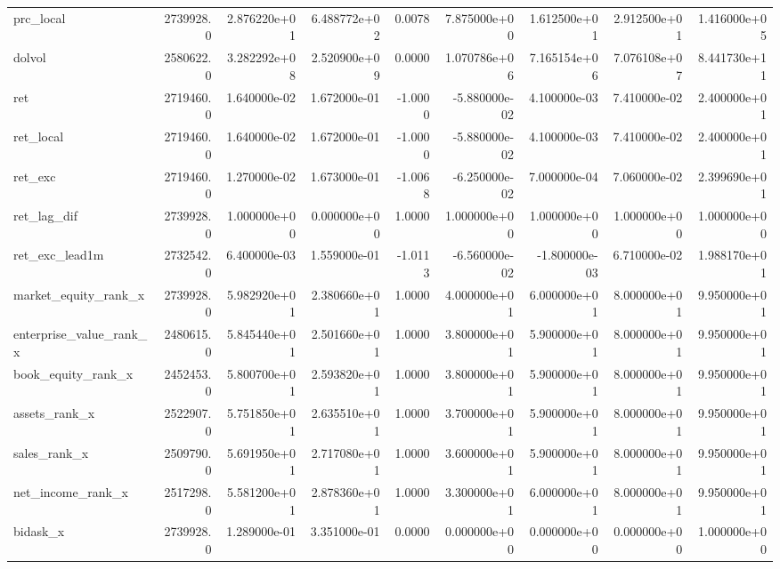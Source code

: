 \documentclass[10pt]{article}
\begin{document}
\begin{landscape}
\begin{longtable}{|l|r|r|r|r|r|r|r|r|}
prc\_local               &  2739928.0 &  2.876220e+01 &  6.488772e+02 &      0.0078 &  7.875000e+00 &  1.612500e+01 &  2.912500e+01 &  1.416000e+05 \\
dolvol                  &  2580622.0 &  3.282292e+08 &  2.520900e+09 &      0.0000 &  1.070786e+06 &  7.165154e+06 &  7.076108e+07 &  8.441730e+11 \\
ret                     &  2719460.0 &  1.640000e-02 &  1.672000e-01 &     -1.0000 & -5.880000e-02 &  4.100000e-03 &  7.410000e-02 &  2.400000e+01 \\
ret\_local               &  2719460.0 &  1.640000e-02 &  1.672000e-01 &     -1.0000 & -5.880000e-02 &  4.100000e-03 &  7.410000e-02 &  2.400000e+01 \\
ret\_exc                 &  2719460.0 &  1.270000e-02 &  1.673000e-01 &     -1.0068 & -6.250000e-02 &  7.000000e-04 &  7.060000e-02 &  2.399690e+01 \\
ret\_lag\_dif             &  2739928.0 &  1.000000e+00 &  0.000000e+00 &      1.0000 &  1.000000e+00 &  1.000000e+00 &  1.000000e+00 &  1.000000e+00 \\
ret\_exc\_lead1m          &  2732542.0 &  6.400000e-03 &  1.559000e-01 &     -1.0113 & -6.560000e-02 & -1.800000e-03 &  6.710000e-02 &  1.988170e+01 \\
market\_equity\_rank\_x    &  2739928.0 &  5.982920e+01 &  2.380660e+01 &      1.0000 &  4.000000e+01 &  6.000000e+01 &  8.000000e+01 &  9.950000e+01 \\
enterprise\_value\_rank\_x &  2480615.0 &  5.845440e+01 &  2.501660e+01 &      1.0000 &  3.800000e+01 &  5.900000e+01 &  8.000000e+01 &  9.950000e+01 \\
book\_equity\_rank\_x      &  2452453.0 &  5.800700e+01 &  2.593820e+01 &      1.0000 &  3.800000e+01 &  5.900000e+01 &  8.000000e+01 &  9.950000e+01 \\
assets\_rank\_x           &  2522907.0 &  5.751850e+01 &  2.635510e+01 &      1.0000 &  3.700000e+01 &  5.900000e+01 &  8.000000e+01 &  9.950000e+01 \\
sales\_rank\_x            &  2509790.0 &  5.691950e+01 &  2.717080e+01 &      1.0000 &  3.600000e+01 &  5.900000e+01 &  8.000000e+01 &  9.950000e+01 \\
net\_income\_rank\_x       &  2517298.0 &  5.581200e+01 &  2.878360e+01 &      1.0000 &  3.300000e+01 &  6.000000e+01 &  8.000000e+01 &  9.950000e+01 \\
bidask\_x                &  2739928.0 &  1.289000e-01 &  3.351000e-01 &      0.0000 &  0.000000e+00 &  0.000000e+00 &  0.000000e+00 &  1.000000e+00 \\

\end{longtable}
\end{landscape}
\end{document}
